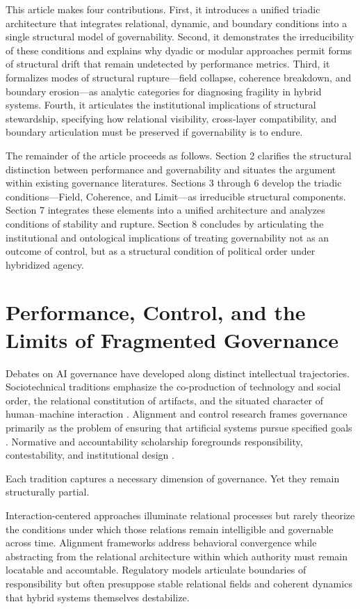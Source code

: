 \documentclass[12pt]{article}
\begin{document}
This article makes four contributions. First, it introduces a unified triadic architecture that integrates relational, dynamic, and boundary conditions into a single structural model of governability. Second, it demonstrates the irreducibility of these conditions and explains why dyadic or modular approaches permit forms of structural drift that remain undetected by performance metrics. Third, it formalizes modes of structural rupture—field collapse, coherence breakdown, and boundary erosion—as analytic categories for diagnosing fragility in hybrid systems. Fourth, it articulates the institutional implications of structural stewardship, specifying how relational visibility, cross-layer compatibility, and boundary articulation must be preserved if governability is to endure.

The remainder of the article proceeds as follows. Section 2 clarifies the structural distinction between performance and governability and situates the argument within existing governance literatures. Sections 3 through 6 develop the triadic conditions—Field, Coherence, and Limit—as irreducible structural components. Section 7 integrates these elements into a unified architecture and analyzes conditions of stability and rupture. Section 8 concludes by articulating the institutional and ontological implications of treating governability not as an outcome of control, but as a structural condition of political order under hybridized agency.

\section{Performance, Control, and the Limits of Fragmented Governance}


Debates on AI governance have developed along distinct intellectual trajectories. Sociotechnical traditions emphasize the co-production of technology and social order, the relational constitution of artifacts, and the situated character of human–machine interaction \citep{Jasanoff2004,Latour2005}. Alignment and control research frames governance primarily as the problem of ensuring that artificial systems pursue specified goals \citep{Bostrom2014,Russell2019}. Normative and accountability scholarship foregrounds responsibility, contestability, and institutional design \citep{Floridi2018,Dignum2019}.

Each tradition captures a necessary dimension of governance. Yet they remain structurally partial.

Interaction-centered approaches illuminate relational processes but rarely theorize the conditions under which those relations remain intelligible and governable across time. Alignment frameworks address behavioral convergence while abstracting from the relational architecture within which authority must remain locatable and accountable. Regulatory models articulate boundaries of responsibility but often presuppose stable relational fields and coherent dynamics that hybrid systems themselves destabilize.
\end{document}
